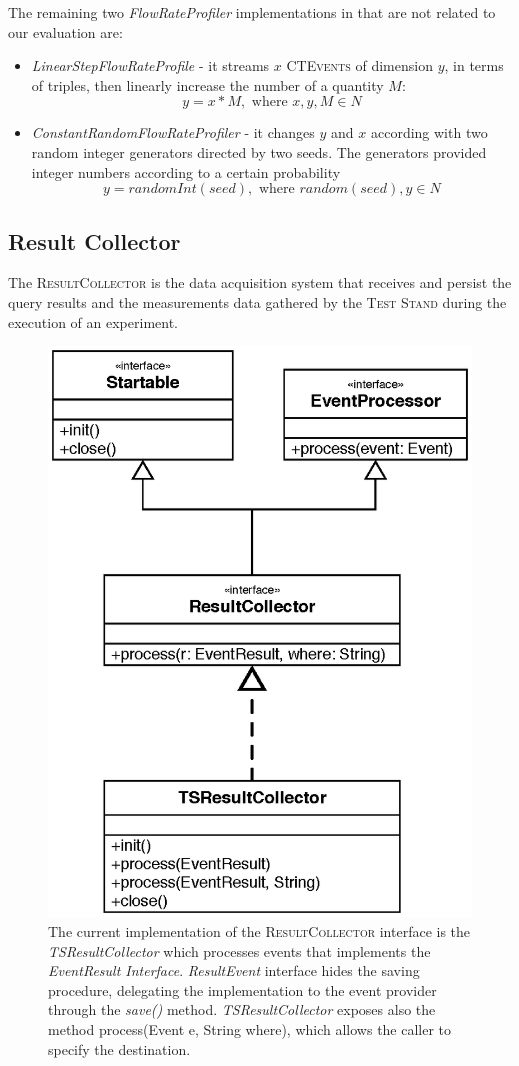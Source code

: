 The remaining two  \textit{FlowRateProfiler} implementations in \name that are not related to our evaluation are:
\begin{itemize}
\item \textit{LinearStepFlowRateProfile} - it streams $x$ \textsc{CTEvents} of dimension $y$, in terms of triples, then linearly increase the number of a quantity $M$: \[y=x*M, \text{ where } x,y,M \in N\]
\item \textit{ConstantRandomFlowRateProfiler} - it changes $y$ and $x$ according with two random integer generators directed by two seeds. The generators provided integer numbers according to a certain probability \[y=randomInt(seed), \text{ where } random(seed),y \in N\]
\end{itemize}


\subsection{Result Collector}\label{sec:result-collector-impl}

\noindent The \textsc{ResultCollector} is the data acquisition system that receives and persist the query results and the measurements data gathered by the \textsc{Test Stand} during the execution of an experiment.

\begin{figure}[tbh]
  \centering
	\includegraphics[width=0.5\linewidth]{images/uml_resultcollector}
	\caption[\textsc{ResultCollector} Current Implementation - UML Schema]{The current implementation of the \textsc{ResultCollector} interface is the \textit{TSResultCollector} which processes events that implements the \textit{EventResult Interface}. \textit{ResultEvent} interface hides the saving procedure, delegating the implementation to the event provider through    the \textit{save()} method. \textit{TSResultCollector} exposes also the method process(Event e, String where), which allows the caller to specify the destination. } 
  	\label{fig:uml_resultcollector}
\end{figure}

